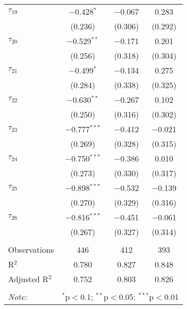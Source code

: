 \begin{tabular}{@{\extracolsep{5pt}}lccc}
 $\tau_{19}$ & $-$0.428$^{*}$ & $-$0.067 & 0.283 \\ 
  & (0.236) & (0.306) & (0.292) \\ 
   
 $\tau_{20}$ & $-$0.529$^{**}$ & $-$0.171 & 0.201 \\ 
  & (0.256) & (0.318) & (0.304) \\ 
   
 $\tau_{21}$ & $-$0.499$^{*}$ & $-$0.134 & 0.275 \\ 
  & (0.284) & (0.338) & (0.325) \\ 
   
 $\tau_{22}$ & $-$0.630$^{**}$ & $-$0.267 & 0.102 \\ 
  & (0.250) & (0.316) & (0.302) \\ 
   
 $\tau_{23}$ & $-$0.777$^{***}$ & $-$0.412 & $-$0.021 \\ 
  & (0.269) & (0.328) & (0.315) \\ 
   
 $\tau_{24}$ & $-$0.750$^{***}$ & $-$0.386 & 0.010 \\ 
  & (0.273) & (0.330) & (0.317) \\ 
   
 $\tau_{25}$ & $-$0.898$^{***}$ & $-$0.532 & $-$0.139 \\ 
  & (0.270) & (0.329) & (0.316) \\ 
   
 $\tau_{26}$ & $-$0.816$^{***}$ & $-$0.451 & $-$0.061 \\ 
  & (0.267) & (0.327) & (0.314) \\ 
   
\hline \\[-1.8ex] 
Observations & 446 & 412 & 393 \\ 
R$^{2}$ & 0.780 & 0.827 & 0.848 \\ 
Adjusted R$^{2}$ & 0.752 & 0.803 & 0.826 \\ 
\hline 
\hline \\[-1.8ex] 
\textit{Note:}  & \multicolumn{3}{r}{$^{*}$p$<$0.1; $^{**}$p$<$0.05; $^{***}$p$<$0.01} \\ 
\end{tabular} 